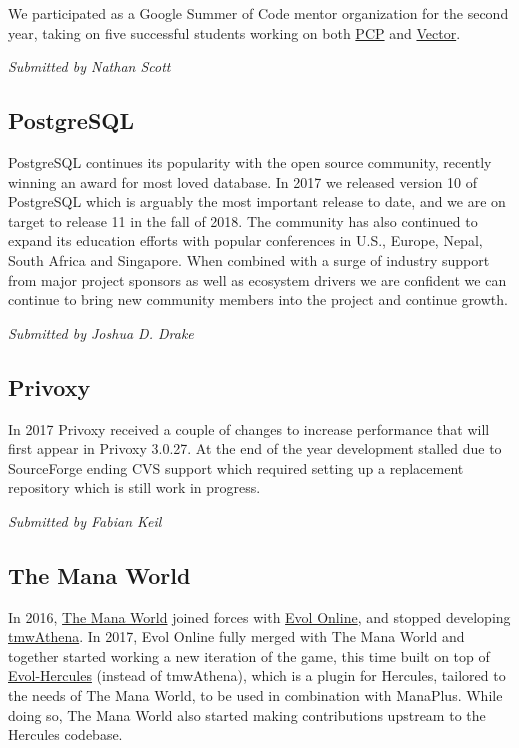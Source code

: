 \documentclass[a4paper]{report}
\begin{document}
We participated as a Google Summer of Code mentor organization for the
second year, taking on five successful students working on both
\href{http://pcp.io/}{PCP} and \href{http://getvector.io}{Vector}.

{\em Submitted by Nathan Scott}

\subsection{PostgreSQL}

PostgreSQL continues its popularity with the open source community,
recently winning an award for most loved database. In 2017 we released
version 10 of PostgreSQL which is arguably the most important release to
date, and we are on target to release 11 in the fall of 2018.  The
community has also continued to expand its education efforts with
popular conferences in U.S., Europe, Nepal, South Africa and Singapore.
When combined with a surge of industry support from major project
sponsors as well as ecosystem drivers we are confident we can continue
to bring new community members into the project and continue growth.

{\em Submitted by Joshua D. Drake}

\subsection{Privoxy}

In 2017 Privoxy received a couple of changes to increase performance
that will first appear in Privoxy 3.0.27.  At the end of the year
development stalled due to SourceForge ending CVS support which required
setting up a replacement repository which is still work in progress.

{\em Submitted by Fabian Keil}

\subsection{The Mana World}

In 2016, \href{https://www.themanaworld.org/}{The Mana World} joined
forces with \href{https://evolonline.org/}{Evol Online}, and stopped
developing \href{https://github.com/themanaworld/tmwa}{tmwAthena}.  In
2017, Evol Online fully merged with The Mana World and together started
working a new iteration of the game, this time built on top of
\href{https://gitlab.com/evol/evol-hercules}{Evol-Hercules} (instead of
tmwAthena), which is a plugin for Hercules, tailored to the needs of The
Mana World, to be used in combination with ManaPlus. While doing so, The
Mana World also started making contributions upstream to the Hercules
codebase.
\end{document}
